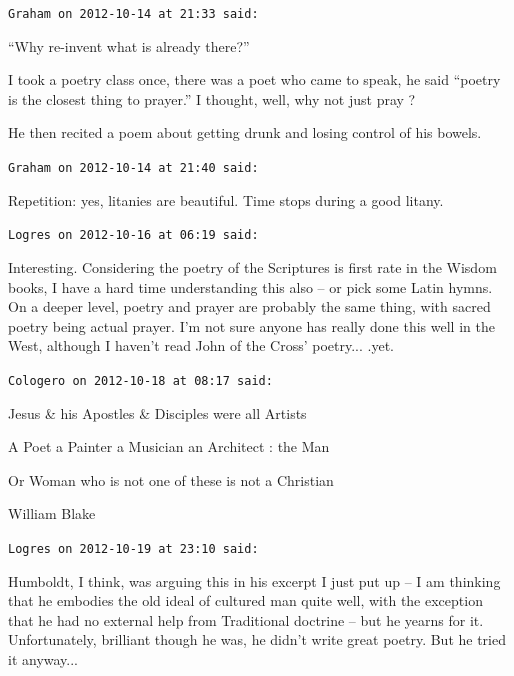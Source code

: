 \begin{footnotesize}
\begin{sffamily}
\hfill

\texttt{Graham on 2012-10-14 at 21:33 said:}

``Why re-invent what is already there?''

I took a poetry class once, there was a poet who came to speak, he said ``poetry is the closest thing to prayer.'' I thought, well, why not just pray ?

He then recited a poem about getting drunk and losing control of his bowels.

\hfill

\texttt{Graham on 2012-10-14 at 21:40 said:}

Repetition: yes, litanies are beautiful. Time stops during a good litany.

\hfill

\texttt{Logres on 2012-10-16 at 06:19 said:}

Interesting. Considering the poetry of the Scriptures is first rate in the Wisdom books, I have a hard time understanding this also -- or pick some Latin hymns. On a deeper level, poetry and prayer are probably the same thing, with sacred poetry being actual prayer. I'm not sure anyone has really done this well in the West, although I haven't read John of the Cross' poetry... .yet.

\hfill

\texttt{Cologero on 2012-10-18 at 08:17 said:}

Jesus \& his Apostles \& Disciples were all Artists

A Poet a Painter a Musician an Architect : the Man

Or Woman who is not one of these is not a Christian

William Blake


\hfill

\texttt{Logres on 2012-10-19 at 23:10 said:}

Humboldt, I think, was arguing this in his excerpt I just put up -- I am thinking that he embodies the old ideal of cultured man quite well, with the exception that he had no external help from Traditional doctrine -- but he yearns for it. Unfortunately, brilliant though he was, he didn't write great poetry. But he tried it anyway... 

\hfill

\end{sffamily}
\end{footnotesize}

